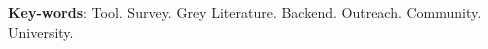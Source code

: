 \begin{resumo}[Abstract]

 \vspace{\onelineskip}
 
 \noindent 
 \textbf{Key-words}: Tool. Survey. Grey Literature. Backend. Outreach. Community. University.
\end{resumo}
